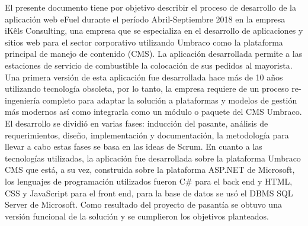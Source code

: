 \documentclass[pregrado, table]{tesis-usb}
\begin{document}
    \frontmatter
    \maketitle
    \begin{resumen}
        El presente documento tiene por objetivo describir el proceso de desarrollo de la aplicación web eFuel durante el período Abril-Septiembre 2018 en la empresa iKêls Consulting, una empresa que se especializa en el desarrollo de aplicaciones y sitios web para el sector corporativo utilizando Umbraco como la plataforma principal de manejo de contenido (CMS). La aplicación desarrollada permite a las estaciones de servicio de combustible la colocación de sus pedidos al mayorista. Una primera versión de esta aplicación fue desarrollada hace más de 10 años utilizando tecnología obsoleta, por lo tanto, la empresa requiere de un proceso re-ingeniería completo para adaptar la solución a plataformas y modelos de gestión más modernos así como integrarla como un módulo o paquete del CMS Umbraco. El desarrollo se dividió en varias fases: inducción del pasante, análisis de requerimientos, diseño, implementación y documentación, la metodología para llevar a cabo estas fases se basa en las ideas de Scrum. En cuanto a las tecnologías utilizadas, la aplicación fue desarrollada sobre la plataforma Umbraco CMS que está, a su vez, construida sobre la plataforma ASP.NET de Microsoft, los lenguajes de programación utilizados fueron C\# para el back end y HTML, CSS y JavaScript para el front end, para la base de datos se usó el DBMS SQL Server de Microsoft. Como resultado del proyecto de pasantía se obtuvo una versión funcional de la solución y se cumplieron los objetivos planteados.
    \end{resumen}
    \tableofcontents
    \listoffigures

    \mainmatter
    
    
    
    
    
    
    
    
    \nocite{*}
    
    \appendix
    
    
\end{document}
